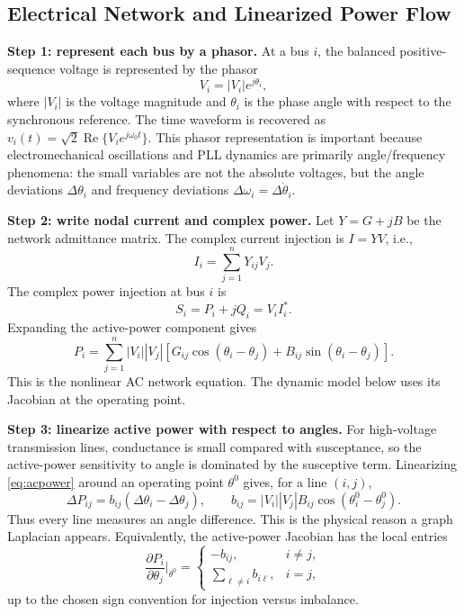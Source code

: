 \documentclass[conference]{IEEEtran}
\newcommand{\Real}{\operatorname{Re}}
\begin{document}
\subsection{Electrical Network and Linearized Power Flow}

\noindent\textbf{Step 1: represent each bus by a phasor.}
At a bus $i$, the balanced positive-sequence voltage is represented by the
phasor
\begin{equation}
  V_i = |V_i|e^{j\theta_i},
  \label{eq:phasor}
\end{equation}
where $|V_i|$ is the voltage magnitude and $\theta_i$ is the phase angle with
respect to the synchronous reference. The time waveform is recovered as
$v_i(t)=\sqrt{2}\Real\{V_i e^{j\omega_0t}\}$. This phasor representation is
important because electromechanical oscillations and PLL dynamics are primarily
angle/frequency phenomena: the small variables are not the absolute voltages,
but the angle deviations $\Delta\theta_i$ and frequency deviations
$\Delta\omega_i=\Delta\dot\theta_i$.

\noindent\textbf{Step 2: write nodal current and complex power.}
Let $Y=G+jB$ be the network admittance matrix. The complex current injection is
$I=YV$, i.e.,
\begin{equation}
  I_i=\sum_{j=1}^{n}Y_{ij}V_j .
  \label{eq:current}
\end{equation}
The complex power injection at bus $i$ is
\begin{equation}
  S_i=P_i+jQ_i=V_i I_i^\ast .
  \label{eq:complexpower}
\end{equation}
Expanding the active-power component gives
\begin{equation}
  P_i=\sum_{j=1}^{n}|V_i||V_j|
  \left[
  G_{ij}\cos(\theta_i-\theta_j)
  +B_{ij}\sin(\theta_i-\theta_j)
  \right].
  \label{eq:acpower}
\end{equation}
This is the nonlinear AC network equation. The dynamic model below uses its
Jacobian at the operating point.

\noindent\textbf{Step 3: linearize active power with respect to angles.}
For high-voltage transmission lines, conductance is small compared with
susceptance, so the active-power sensitivity to angle is dominated by the
susceptive term. Linearizing \eqref{eq:acpower} around an operating point
$\theta^0$ gives, for a line $(i,j)$,
\begin{equation}
  \Delta P_{ij}=b_{ij}(\Delta\theta_i-\Delta\theta_j),
  \qquad
  b_{ij}=|V_i||V_j|B_{ij}\cos(\theta_i^0-\theta_j^0).
  \label{eq:lineflow}
\end{equation}
Thus every line measures an angle difference. This is the physical reason a
graph Laplacian appears.
Equivalently, the active-power Jacobian has the local entries
\begin{equation}
  \frac{\partial P_i}{\partial\theta_j}\bigg|_{\theta^0}
  =
  \begin{cases}
  -b_{ij}, & i\neq j,\\
  \sum_{\ell\neq i}b_{i\ell}, & i=j,
  \end{cases}
  \label{eq:jacentries}
\end{equation}
up to the chosen sign convention for injection versus imbalance.
\end{document}
